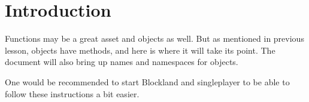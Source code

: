 \section{Introduction}

Functions may be a great asset and objects as well. But as mentioned in previous lesson, objects have methods, and here is where it will take its point. The document will also bring up names and namespaces for objects.

One would be recommended to start Blockland and singleplayer to be able to follow these instructions a bit easier.
